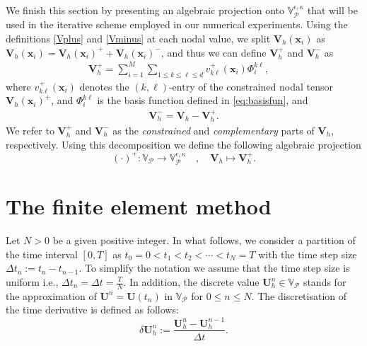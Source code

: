 \documentclass[final,12pt]{amsart}
\theoremstyle{plain}
\theoremstyle{definition}
\newcommand\bx{\boldsymbol{x}}
\newcommand\calP{{\mathcal{P}}}
\newcommand\bU{\mathbf{U}}
\begin{document}
We finish this section by presenting an algebraic projection onto $\mathbb{V}_\calP^{\epsilon,\kappa}$
that will be used in the iterative scheme employed in our numerical experiments.
Using the definitions \eqref{Vplus} and \eqref{Vminus} at each nodal value, we split $\mathbf{V}_{h}(\bx_{i})$ as 
$\mathbf{V}_{h}(\bx_{i})=\mathbf{V}_h(\bx_{i})^{+}+\mathbf{V}_h(\bx_{i})^{-}$, and thus we can define $\mathbf{V}_{h}^{+}$ and $\mathbf{V}_{h}^{-}$ as
\begin{align}
\mathbf{V}_{h}^{+}=\sum_{i=1}^{M} \sum_{1 \leq k \leq \ell \leq d} v_{k\ell}^{+}(\bx_i) 	\Phi^{k\ell}_{i} ,\quad \label{eq17}
\end{align}
where $v_{k\ell}^{+}(\bx_i)$ denotes the $(k,\ell)$-entry of the constrained nodal tensor $\mathbf{V}_h(\bx_i)^{+}$, and $\Phi^{k\ell}_{i}$ is the basis function defined in \eqref{eq:basisfun}, and 
\begin{align}
	\mathbf{V}_h^{-}=\mathbf{V}_h-\mathbf{V}_{h}^{+}. \label{eq18}
\end{align}
We refer to $\mathbf{V}_{h}^{+}$ and $\mathbf{V}_{h}^{-}$ as the \textit{constrained}
and \textit{complementary} parts of $\mathbf{V}_{h}$, respectively. Using this
decomposition we define the following algebraic projection
\begin{equation}
	(\cdot)^{+}:\mathbb{V}_{\mathcal{P}}\rightarrow \mathbb{V}_{\calP}^{\epsilon,\kappa}\quad,\quad
	\mathbf{V}_{h}\longmapsto \mathbf{V}_{h}^{+} . \label{posoperator}
\end{equation} 
	
\section{The finite element method}\label{Sec:FEM}

Let $N>0$ be a given positive integer. In what follows, we consider a partition of the time interval $[0,T]$ as $t_{0}=0<t_{1}<t_{2}<\cdots<t_{N}=T$ with the time step size $\Delta t_{n}:=t_{n}-t_{n-1}$. To simplify the notation we assume that the time step size is uniform i.e., $\Delta t_{n}=\Delta t=\frac{T}{N}$. In addition, the discrete value $\bU_{h}^{n}\in \mathbb{V}_\calP$ stands for the approximation of $\bU^{n}=\mathbf{U}(t_{n})$ in $\mathbb{V}_\calP$ for $0\leq n \leq N$.   The discretisation of the time derivative is defined as follows:
\begin{equation*}
 \delta \mathbf{U}_{h}^{n} :=\frac{\bU_{h}^{n}-\mathbf{U}_{h}^{n-1}}{\Delta t} .
 \end{equation*}
\end{document}

